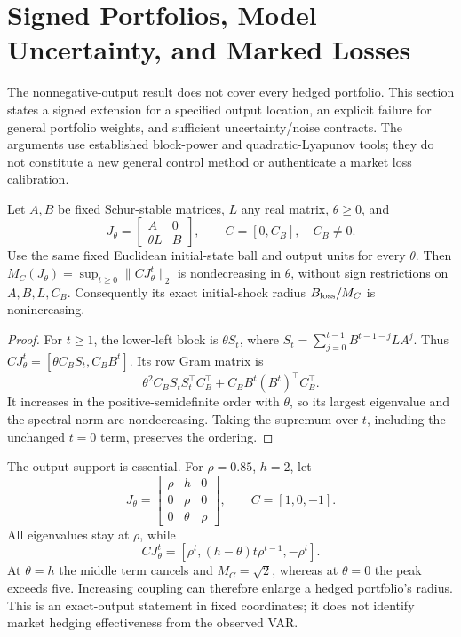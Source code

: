 \section{Signed Portfolios, Model Uncertainty, and Marked Losses}
\label{sec:risk_contract_extensions}
The nonnegative-output result does not cover every hedged portfolio. This section states a signed extension for a specified output location, an explicit failure for general portfolio weights, and sufficient uncertainty/noise contracts. The arguments use established block-power and quadratic-Lyapunov tools; they do not constitute a new general control method or authenticate a market loss calibration.

\begin{proposition}
\label{prop:signed_target_coupling}
Let $A,B$ be fixed Schur-stable matrices, $L$ any real matrix, $\theta\ge0$, and
\[
J_\theta=\begin{bmatrix}A&0\\\theta L&B\end{bmatrix},\qquad C=[0,C_B],\quad C_B\ne0.
\]
Use the same fixed Euclidean initial-state ball and output units for every $\theta$. Then $M_C(J_\theta)=\sup_{t\ge0}\|CJ_\theta^t\|_2$ is nondecreasing in $\theta$, without sign restrictions on $A,B,L,C_B$. Consequently its exact initial-shock radius $B_{\rm loss}/M_C$ is nonincreasing.
\end{proposition}
\begin{proof}
For $t\ge1$, the lower-left block is $\theta S_t$, where $S_t=\sum_{j=0}^{t-1}B^{t-1-j}LA^j$. Thus $CJ_\theta^t=[\theta C_BS_t,C_BB^t]$. Its row Gram matrix is
\[
\theta^2 C_BS_tS_t^\top C_B^\top+C_BB^t(B^t)^\top C_B^\top.
\]
It increases in the positive-semidefinite order with $\theta$, so its largest eigenvalue and the spectral norm are nondecreasing. Taking the supremum over $t$, including the unchanged $t=0$ term, preserves the ordering.
\end{proof}
The output support is essential. For $\rho=0.85$, $h=2$, let
\[
J_\theta=\begin{bmatrix}\rho&h&0\\0&\rho&0\\0&\theta&\rho\end{bmatrix},\qquad C=[1,0,-1].
\]
All eigenvalues stay at $\rho$, while
\[
CJ_\theta^t=[\rho^t,(h-\theta)t\rho^{t-1},-\rho^t].
\]
At $\theta=h$ the middle term cancels and $M_C=\sqrt2$, whereas at $\theta=0$ the peak exceeds five. Increasing coupling can therefore enlarge a hedged portfolio's radius. This is an exact-output statement in fixed coordinates; it does not identify market hedging effectiveness from the observed VAR.

